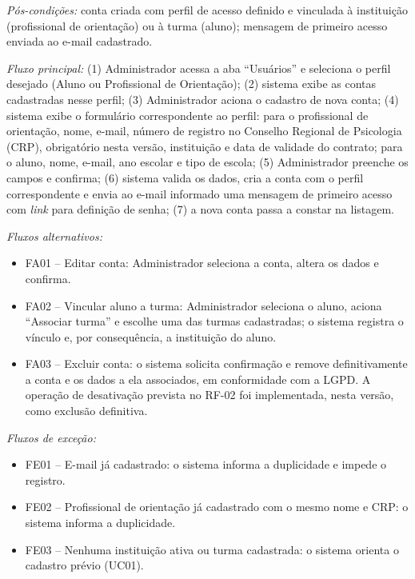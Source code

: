 \textit{Pós-condições:} conta criada com perfil de acesso definido e vinculada à instituição (profissional de orientação) ou à turma (aluno); mensagem de primeiro acesso enviada ao e-mail cadastrado.

\textit{Fluxo principal:} (1) Administrador acessa a aba ``Usuários'' e seleciona o perfil desejado (Aluno ou Profissional de Orientação); (2) sistema exibe as contas cadastradas nesse perfil; (3) Administrador aciona o cadastro de nova conta; (4) sistema exibe o formulário correspondente ao perfil: para o profissional de orientação, nome, e-mail, número de registro no Conselho Regional de Psicologia (CRP), obrigatório nesta versão, instituição e data de validade do contrato; para o aluno, nome, e-mail, ano escolar e tipo de escola; (5) Administrador preenche os campos e confirma; (6) sistema valida os dados, cria a conta com o perfil correspondente e envia ao e-mail informado uma mensagem de primeiro acesso com \textit{link} para definição de senha; (7) a nova conta passa a constar na listagem.

\textit{Fluxos alternativos:}

\begin{itemize}[label={},leftmargin=\parindent,itemsep=0pt,topsep=0pt]
  \item FA01 – Editar conta: Administrador seleciona a conta, altera os dados e confirma.
  \item FA02 – Vincular aluno a turma: Administrador seleciona o aluno, aciona ``Associar turma'' e escolhe uma das turmas cadastradas; o sistema registra o vínculo e, por consequência, a instituição do aluno.
  \item FA03 – Excluir conta: o sistema solicita confirmação e remove definitivamente a conta e os dados a ela associados, em conformidade com a LGPD. A operação de desativação prevista no RF-02 foi implementada, nesta versão, como exclusão definitiva.
\end{itemize}

\textit{Fluxos de exceção:}

\begin{itemize}[label={},leftmargin=\parindent,itemsep=0pt,topsep=0pt]
  \item FE01 – E-mail já cadastrado: o sistema informa a duplicidade e impede o registro.
  \item FE02 – Profissional de orientação já cadastrado com o mesmo nome e CRP: o sistema informa a duplicidade.
  \item FE03 – Nenhuma instituição ativa ou turma cadastrada: o sistema orienta o cadastro prévio (UC01).
\end{itemize}

